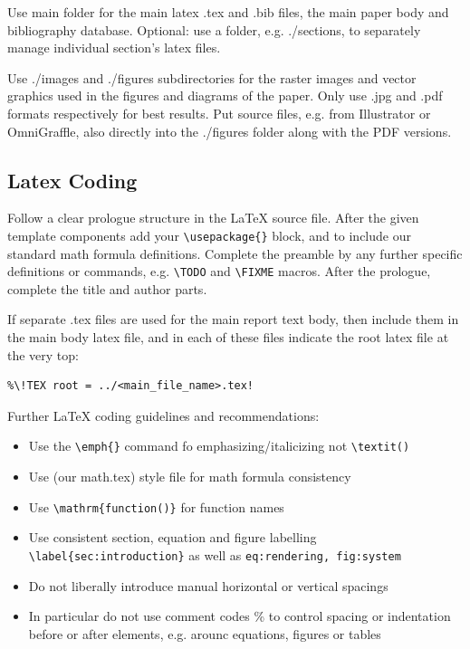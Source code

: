 \documentclass[11pt, a4paper,oneside,chapterprefix=false]{scrbook}
\newcommand{\FIXME}[1]{{\color{RED}{\textbf{FIX}: #1}}}
\begin{document}
Use main folder for the main latex .tex and .bib files, the main paper body and bibliography database. Optional: use a folder, e.g. ./sections, to separately manage individual section's latex files.

Use ./images and ./figures subdirectories for the raster images and vector graphics used in the figures and diagrams of the paper.
Only use .jpg and .pdf formats respectively for best results. Put source files, e.g. from Illustrator or OmniGraffle, also directly into the ./figures folder along with the PDF versions.

\subsection*{Latex Coding}

Follow a clear prologue structure in the LaTeX source file. After the given template components add your \verb!\usepackage{}! block, and \verb!! to include our standard math formula definitions. Complete the preamble by any further specific definitions or commands, e.g. \verb!\TODO! and \verb!\FIXME! macros. After the prologue, complete the title and author parts.

If separate .tex files are used for the main report text body, then include them in the main body latex file, and in each of these files indicate the root latex file at the very top:
\begin{verbatim}
%\!TEX root = ../<main_file_name>.tex!
\end{verbatim}

\noindent
Further LaTeX coding guidelines and recommendations:

\begin{itemize}
\item Use the \verb!\emph{}! command fo emphasizing/italicizing not \verb!\textit()!
\item Use (our math.tex) style file for math formula consistency
\item Use \verb!\mathrm{function()}!  for function names
\item Use consistent section, equation and figure labelling
\verb!\label{sec:introduction}! as well as \texttt{eq:rendering, fig:system}
\item Do not liberally introduce manual horizontal or vertical spacings
\item In particular do not use comment codes \% to control spacing or indentation before or after elements, e.g. arounc equations, figures or tables
\end{itemize}
\end{document}
